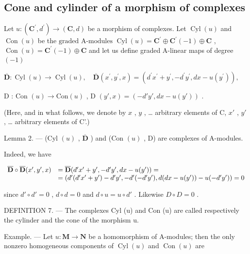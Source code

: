 \subsection{Cone and cylinder of a morphism of complexes}

Let \(u:(\mathbf{C}^{\prime},d^{\prime})\to(\mathbf{C},d)\) be a morphism of complexes. Let \(\operatorname{Cyl}(u)\) and \(\operatorname{Con}(u)\) be the \(\text{graded A-modules }\operatorname{Cyl}(u)=\mathbf{C}^{\prime}\oplus\mathbf{C}^{\prime}(-1)\oplus\mathbf{C}\) , \(\operatorname{Con}(u)=\mathbf{C}^{\prime}(-1)\oplus\mathbf{C}\) and let us define graded A-linear maps of degree \((-1)\)

\(\overline{\mathbf{D}}:\operatorname {Cyl}(u)\to \operatorname {Cyl}(u),\quad \overline{\mathbf{D}} (x^{\prime},y^{\prime},x) = (d^{\prime}x^{\prime} + y^{\prime}, - d^{\prime}y^{\prime},dx - u(y^{\prime})),\)

D : Con \((u) \to \text{Con}(u)\) , D \((y', x) = (-d'y', dx - u(y'))\) .

(Here, and in what follows, we denote by \(x\) , \(y\) , \ldots{} arbitrary elements of C, \(x'\) , \(y'\) , \ldots{} arbitrary elements of C'.)

Lemma 2. --- (Cyl \((u)\) , \(\overline{\mathbf{D}}\) ) and (Con \((u)\) , D) are complexes of A-modules.

Indeed, we have

\[
\begin{array}{r l} \overline {{\mathbf {D}}} \circ \overline {{\mathbf {D}}} (x ^ {\prime}, y ^ {\prime}, x) & = \overline {{\mathbf {D}}} (d ^ {\prime} x ^ {\prime} + y ^ {\prime}, - d ^ {\prime} y ^ {\prime}, d x - u (y ^ {\prime})) = \\ & = (d ^ {\prime} (d ^ {\prime} x ^ {\prime} + y ^ {\prime}) - d ^ {\prime} y ^ {\prime}, - d ^ {\prime} (- d ^ {\prime} y ^ {\prime}), d (d x - u (y ^ {\prime})) - u (- d ^ {\prime} y ^ {\prime})) = 0 \end{array}
\]

since \(d' \circ d' = 0\) , \(d \circ d = 0\) and \(d \circ u = u \circ d'\) . Likewise \(D \circ D = 0\) .

DEFINITION 7. --- The complexes Cyl (u) and Con (u) are called respectively the cylinder and the cone of the morphism u.

Example. --- Let \(u: \mathbf{M} \to \mathbf{N}\) be a homomorphism of A-modules; then the only nonzero homogeneous components of \(\operatorname{Cyl}(u)\) and \(\operatorname{Con}(u)\) are

